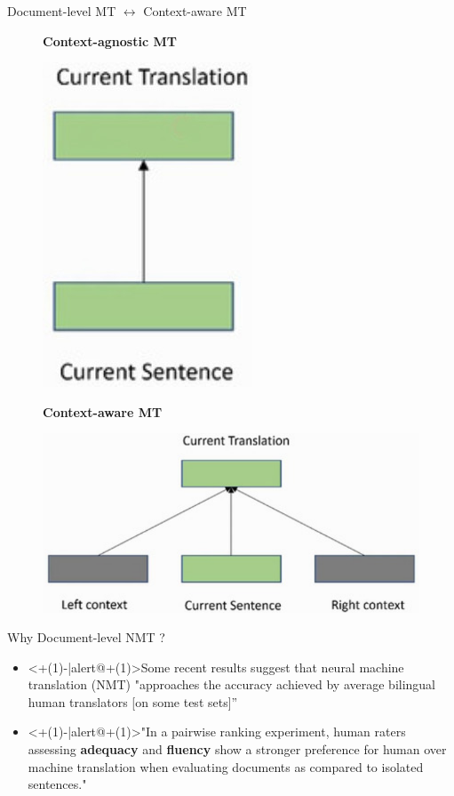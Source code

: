 \begin{frame}{Document-level MT $\leftrightarrow$ Context-aware MT}
	\begin{figure}
	\centering
	\begin{minipage}{.4\textwidth}
		\centering
		\textbf{Context-agnostic MT}\par\medskip
		\includegraphics[width=.4\linewidth]{Images/dlmt}
	\end{minipage}%
	\begin{minipage}{.6\textwidth}
		\centering
		\textbf{Context-aware MT}\par\medskip
		\includegraphics[width=.85\linewidth]{Images/slmt}
	\end{minipage}
	\end{figure}	
\end{frame}

\begin{frame}{Why Document-level NMT ?}
	
	\begin{itemize}
		\item<+(1)-|alert@+(1)>{Some recent results suggest that neural machine translation (NMT) "approaches the accuracy achieved by average bilingual  human  translators  [on  some  test  sets]” \cite{wu_googles_2016}
		}
		
		\item<+(1)-|alert@+(1)>{"In a pairwise ranking experiment, human raters assessing \textbf{adequacy} and \textbf{fluency} show a stronger preference for human over machine translation when evaluating documents as compared to isolated sentences." \cite{laubli_has_2018}
		}
	\end{itemize}
	
	
\end{frame}

